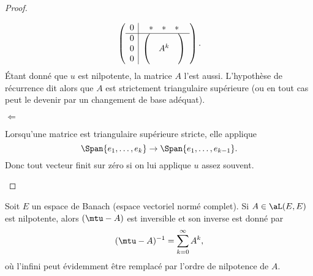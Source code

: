 \begin{proof}
\begin{subproof}
\begin{equation}
               \begin{pmatrix}
                       \begin{array}[]{c|c}
                           0&\begin{matrix}
                               * &   *    &   *
                           \end{matrix}\\
                           \hline
                           \begin{matrix}
                               0 \\
                               0 \\
                               0
                           \end{matrix}&
                           \begin{pmatrix}
                                &       &       \\
                                &   A^k    &       \\
                                &       &
                           \end{pmatrix}
                       \end{array}
               \end{pmatrix}.
           \end{equation}
           Étant donné que \( u\) est nilpotente, la matrice \( A\) l'est aussi. L'hypothèse de récurrence dit alors que \( A\) est strictement triangulaire supérieure (ou en tout cas peut le devenir par un changement de base adéquat).

       \item[\( \Leftarrow\)]

            Lorsqu'une matrice est triangulaire supérieure stricte, elle applique
            \begin{equation}
                \Span\{ e_1,\ldots, e_k \}\to\Span\{ e_1,\ldots, e_{k-1} \}.
            \end{equation}
            Donc tout vecteur finit sur zéro si on lui applique \( u\) assez souvent.
    \end{subproof}
\end{proof}

\begin{proposition}     \label{PROPooWTFWooXHlmhp}
    Soit \( E\) un espace de Banach (espace vectoriel normé complet). Si \( A\in\aL(E,E)\) est nilpotente, alors \( (\mtu-A)\) est inversible et son inverse est donné par
    \begin{equation}
        (\mtu-A)^{-1}=\sum_{k=0}^{\infty}A^k,
    \end{equation}
    où l'infini peut évidemment être remplacé par l'ordre de nilpotence de \( A\).
\end{proposition}

